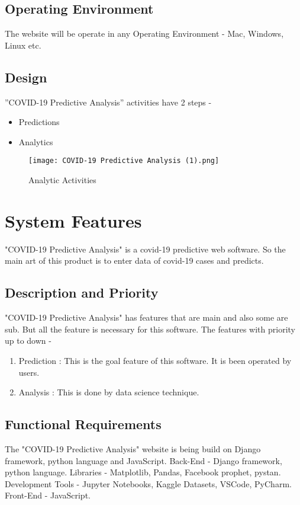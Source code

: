 \documentclass{scrreprt}
\begin{document}
\section{Operating Environment}
The website will be operate in any Operating Environment - Mac, Windows, Linux etc. 

\section{Design}
”COVID-19 Predictive Analysis” activities have 2 steps -
\begin{itemize}
    \item Predictions
    \item Analytics
\end{itemize}

\newpage

\begin{figure}[h!]
    \centering
    \texttt{[image: COVID-19 Predictive Analysis (1).png]}
    \caption{Analytic Activities}
    \label{fig:Analytic Activities}
\end{figure}

\chapter{System Features}
"COVID-19 Predictive Analysis" is a covid-19 predictive web software. So the main art of this product is to enter data of covid-19 cases and predicts. 

\section{Description and Priority}
"COVID-19 Predictive Analysis" has features that are main and also some are sub. But all the feature is necessary for this software.
\newline
The features with priority up to down - 
\begin{enumerate}
    \item Prediction : This is the goal feature of this software. It is been operated by users.
    \item Analysis : This is done by data science technique.
\end{enumerate}

\section{Functional Requirements}
The "COVID-19 Predictive Analysis" website is being build on Django framework, python language and JavaScript.
\newline
Back-End - Django framework, python language.
\newline
Libraries - Matplotlib, Pandas, Facebook prophet, pystan.
\newline
Development Tools - Jupyter Notebooks, Kaggle Datasets, VSCode, PyCharm.
\newline
Front-End - JavaScript.
\end{document}
